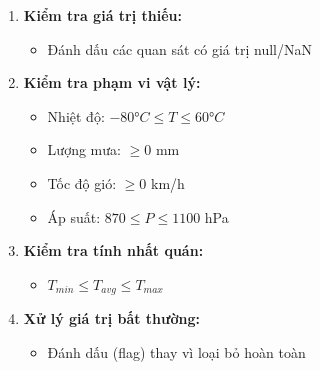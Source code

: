 \documentclass[12pt,a4paper]{article}
\begin{document}
\begin{enumerate}
    \item \textbf{Kiểm tra giá trị thiếu:}
    \begin{itemize}
        \item Đánh dấu các quan sát có giá trị null/NaN
    \end{itemize}
    
    \item \textbf{Kiểm tra phạm vi vật lý:}
    \begin{itemize}
        \item Nhiệt độ: $-80°C \leq T \leq 60°C$
        \item Lượng mưa: $\geq 0$ mm
        \item Tốc độ gió: $\geq 0$ km/h
        \item Áp suất: $870 \leq P \leq 1100$ hPa
    \end{itemize}
    
    \item \textbf{Kiểm tra tính nhất quán:}
    \begin{itemize}
        \item $T_{min} \leq T_{avg} \leq T_{max}$
    \end{itemize}
    
    \item \textbf{Xử lý giá trị bất thường:}
    \begin{itemize}
        \item Đánh dấu (flag) thay vì loại bỏ hoàn toàn
    \end{itemize}
\end{enumerate}
\end{document}
